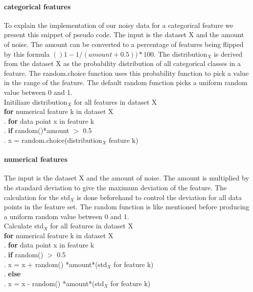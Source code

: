 \documentclass[a4paper,10pt]{article}
\begin{document}
\paragraph{categorical features \newline}
To explain the implementation of our noisy data for a categorical feature we present this snippet of pseudo code. The input is the dataset X and the amount of noise. The amount can be converted to a percentage of features being flipped by this formula $()1-1/(amount+0.5))*100$. The distribution$_X$ is derived from the dataset X as the probability distribution of all categorical classes in a feature. The random.choice function uses this probability function to pick a value in the range of the feature. The default random function picks a uniform random value between 0 and 1.  \\
Initiliaze distribution$_X$ for all features in dataset X\\ 
\newline
\textbf{for} numerical feature k in dataset X\\
.\hspace{1cm} \textbf{for} data point x in feature k\\
.\hspace{2cm} \textbf{if} random()*amount $>$ 0.5 \\	
.\hspace{3cm} x = random.choice(distribution$_X$ feature k) 
\\

\paragraph{numerical features \newline}
The input is the dataset X and the amount of noise. The amount is multiplied by the standard deviation to give the maximum deviation of the feature. The calculation for the std$_X$ is done beforehand to control the deviation for all data points in the feature set. The random function is like mentioned before producing a uniform random value between 0 and 1.\\
Calculate std$_X$ for all features in dataset X\\
\textbf{for} numerical feature k in dataset X\\
.\hspace{1cm} \textbf{for} data point x in feature k\\
.\hspace{2cm} \textbf{if} random() $>$ 0.5 \\	
.\hspace{3cm} x = x + random() *amount*(std$_X$ for feature k)\\
.\hspace{2cm} \textbf{else}  \\	
.\hspace{3cm} x = x - random() *amount*(std$_X$ for feature k) 
\\
\end{document}

